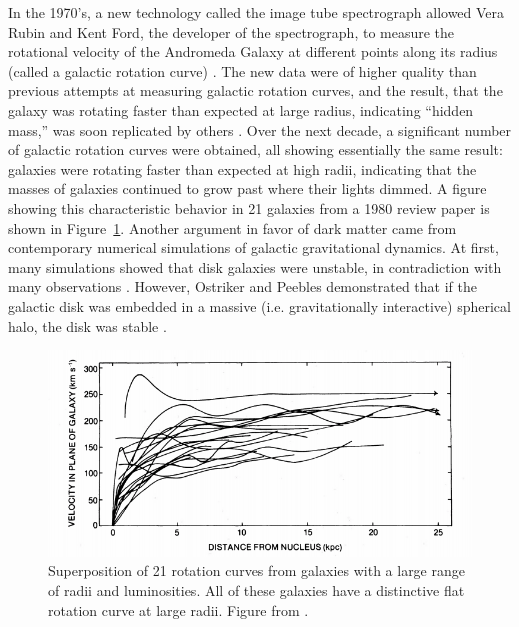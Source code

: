 In the 1970's, a new technology called the image tube spectrograph allowed Vera Rubin and Kent Ford, the developer of the spectrograph, to measure the rotational velocity of the Andromeda Galaxy at different points along its radius (called a galactic rotation curve) \cite{Rubin1970}. The new data were of higher quality than previous attempts at measuring galactic rotation curves, and the result, that the galaxy was rotating faster than expected at large radius, indicating ``hidden mass,'' was soon replicated by others \cite{Bertone2016}. Over the next decade, a significant number of galactic rotation curves were obtained, all showing essentially the same result: galaxies were rotating faster than expected at high radii, indicating that the masses of galaxies continued to grow past where their lights dimmed. A figure showing this characteristic behavior in 21 galaxies from a 1980 review paper \cite{Rubin1980} is shown in Figure~\ref{fig:curves}. Another argument in favor of dark matter came from contemporary numerical simulations of galactic gravitational dynamics. At first, many simulations showed that disk galaxies were unstable, in contradiction with many observations \cite{Bertone2016}. However, Ostriker and Peebles demonstrated that if the galactic disk was embedded in a massive (i.e. gravitationally interactive) spherical halo, the disk was stable \cite{Peebles1973}.

\begin{figure}[htbp]
\begin{center}
\includegraphics[width=\textwidth]{figures/theory/rot_curves.png}
\caption{Superposition of 21 rotation curves from galaxies with a large range of radii and luminosities. All of these galaxies have a distinctive flat rotation curve at large radii. Figure from \cite{Rubin1980}.}
\label{fig:curves}
\end{center}
\end{figure}


